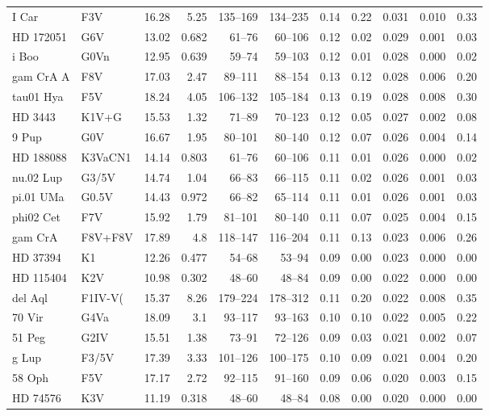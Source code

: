 \documentclass[11pt,a4paper]{article}
\begin{document}
{\begin{longtable}{llrrrrrrrrr}
I Car & F3V & 16.28 & 5.25 & 135--169 & 134--235 & 0.14 & 0.22 & 0.031 & 0.010 & 0.33 \\
HD 172051 & G6V & 13.02 & 0.682 & 61--76 & 60--106 & 0.12 & 0.02 & 0.029 & 0.001 & 0.03 \\
i Boo & G0Vn & 12.95 & 0.639 & 59--74 & 59--103 & 0.12 & 0.01 & 0.028 & 0.000 & 0.02 \\
gam CrA A & F8V & 17.03 & 2.47 & 89--111 & 88--154 & 0.13 & 0.12 & 0.028 & 0.006 & 0.20 \\
tau01 Hya & F5V & 18.24 & 4.05 & 106--132 & 105--184 & 0.13 & 0.19 & 0.028 & 0.008 & 0.30 \\
HD   3443 & K1V+G & 15.53 & 1.32 & 71--89 & 70--123 & 0.12 & 0.05 & 0.027 & 0.002 & 0.08 \\
9 Pup & G0V & 16.67 & 1.95 & 80--101 & 80--140 & 0.12 & 0.07 & 0.026 & 0.004 & 0.14 \\
HD 188088 & K3VaCN1 & 14.14 & 0.803 & 61--76 & 60--106 & 0.11 & 0.01 & 0.026 & 0.000 & 0.02 \\
nu.02 Lup & G3/5V & 14.74 & 1.04 & 66--83 & 66--115 & 0.11 & 0.02 & 0.026 & 0.001 & 0.03 \\
pi.01 UMa & G0.5V & 14.43 & 0.972 & 66--82 & 65--114 & 0.11 & 0.01 & 0.026 & 0.001 & 0.03 \\
phi02 Cet & F7V & 15.92 & 1.79 & 81--101 & 80--140 & 0.11 & 0.07 & 0.025 & 0.004 & 0.15 \\
gam CrA & F8V+F8V & 17.89 & 4.8 & 118--147 & 116--204 & 0.11 & 0.13 & 0.023 & 0.006 & 0.26 \\
HD  37394 & K1 & 12.26 & 0.477 & 54--68 & 53--94 & 0.09 & 0.00 & 0.023 & 0.000 & 0.00 \\
HD 115404 & K2V & 10.98 & 0.302 & 48--60 & 48--84 & 0.09 & 0.00 & 0.022 & 0.000 & 0.00 \\
del Aql & F1IV-V( & 15.37 & 8.26 & 179--224 & 178--312 & 0.11 & 0.20 & 0.022 & 0.008 & 0.35 \\
70 Vir & G4Va & 18.09 & 3.1 & 93--117 & 93--163 & 0.10 & 0.10 & 0.022 & 0.005 & 0.22 \\
51 Peg & G2IV & 15.51 & 1.38 & 73--91 & 72--126 & 0.09 & 0.03 & 0.021 & 0.002 & 0.07 \\
g Lup & F3/5V & 17.39 & 3.33 & 101--126 & 100--175 & 0.10 & 0.09 & 0.021 & 0.004 & 0.20 \\
58 Oph & F5V & 17.17 & 2.72 & 92--115 & 91--160 & 0.09 & 0.06 & 0.020 & 0.003 & 0.15 \\
HD  74576 & K3V & 11.19 & 0.318 & 48--60 & 48--84 & 0.08 & 0.00 & 0.020 & 0.000 & 0.00 \\

\end{longtable}}
\end{document}
